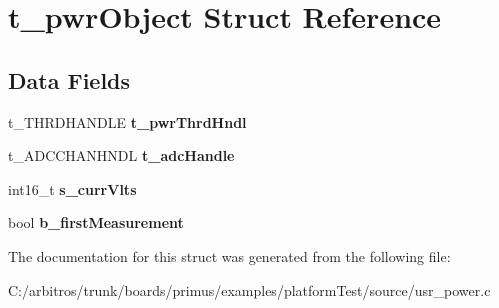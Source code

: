 \hypertarget{structt__pwr_object}{\section{t\-\_\-pwr\-Object Struct Reference}
\label{structt__pwr_object}
}
\subsection*{Data Fields}
\begin{DoxyCompactItemize}
\item 
\hypertarget{structt__pwr_object_a3323ac9bcb8e3ab42b5c728a5cfd0cdf}{t\-\_\-\-T\-H\-R\-D\-H\-A\-N\-D\-L\-E {\bfseries t\-\_\-pwr\-Thrd\-Hndl}}\label{structt__pwr_object_a3323ac9bcb8e3ab42b5c728a5cfd0cdf}

\item 
\hypertarget{structt__pwr_object_a4207c8819b007c1645ac75524e2d92d2}{t\-\_\-\-A\-D\-C\-C\-H\-A\-N\-H\-N\-D\-L {\bfseries t\-\_\-adc\-Handle}}\label{structt__pwr_object_a4207c8819b007c1645ac75524e2d92d2}

\item 
\hypertarget{structt__pwr_object_ad32be61d595b9542ede8559be660ea19}{int16\-\_\-t {\bfseries s\-\_\-curr\-Vlts}}\label{structt__pwr_object_ad32be61d595b9542ede8559be660ea19}

\item 
\hypertarget{structt__pwr_object_ad22627706cc049c4ce41840ca1093da7}{bool {\bfseries b\-\_\-first\-Measurement}}\label{structt__pwr_object_ad22627706cc049c4ce41840ca1093da7}

\end{DoxyCompactItemize}


The documentation for this struct was generated from the following file\-:\begin{DoxyCompactItemize}
\item 
C\-:/arbitros/trunk/boards/primus/examples/platform\-Test/source/usr\-\_\-power.\-c\end{DoxyCompactItemize}
